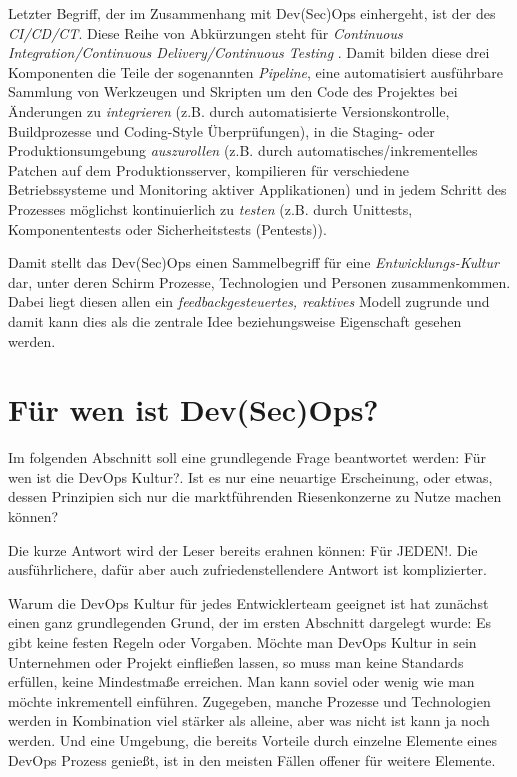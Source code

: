 Letzter Begriff, der im Zusammenhang mit Dev(Sec)Ops einhergeht, ist der des \emph{CI/CD/CT}. Diese Reihe von Abkürzungen steht für \emph{Continuous Integration/Continuous Delivery/Continuous Testing} \cite{kinsbrunerHowMakeCI2018}. Damit bilden diese drei Komponenten die Teile der sogenannten \emph{Pipeline}, eine automatisiert ausführbare Sammlung von Werkzeugen und Skripten um den Code des Projektes bei Änderungen zu \emph{integrieren} (z.B. durch automatisierte Versionskontrolle, Buildprozesse und Coding-Style Überprüfungen), in die Staging- oder Produktionsumgebung \emph{auszurollen} (z.B. durch automatisches/inkrementelles Patchen auf dem Produktionsserver, kompilieren für verschiedene Betriebssysteme und Monitoring aktiver Applikationen) und in jedem Schritt des Prozesses möglichst kontinuierlich zu \emph{testen} (z.B. durch Unittests, Komponententests oder Sicherheitstests (Pentests)). 

Damit stellt das Dev(Sec)Ops einen Sammelbegriff für eine \emph{Entwicklungs-Kultur} \cite{kolblSoftwareentwicklungMitDev2021} dar, unter deren Schirm Prozesse, Technologien und Personen zusammenkommen. Dabei liegt diesen allen ein \emph{feedbackgesteuertes, reaktives} Modell zugrunde und damit kann dies als die zentrale Idee beziehungsweise Eigenschaft gesehen werden.

\section{Für wen ist Dev(Sec)Ops?}

Im folgenden Abschnitt soll eine grundlegende Frage beantwortet werden: \glqq Für wen ist die DevOps Kultur?\grqq{}. 
Ist es nur eine neuartige Erscheinung, oder etwas, dessen Prinzipien sich nur die marktführenden Riesenkonzerne zu Nutze machen können?

Die kurze Antwort wird der Leser bereits erahnen können: \glqq Für JEDEN!\grqq{}. Die ausführlichere, dafür aber auch zufriedenstellendere Antwort ist komplizierter. 

Warum die DevOps Kultur für jedes Entwicklerteam geeignet ist hat zunächst einen ganz grundlegenden Grund, der im ersten Abschnitt dargelegt wurde: Es gibt keine festen Regeln oder Vorgaben. Möchte man DevOps Kultur in sein Unternehmen oder Projekt einfließen lassen, so muss man keine Standards erfüllen, keine Mindestmaße erreichen. 
Man kann soviel oder wenig wie man möchte inkrementell einführen.
Zugegeben, manche Prozesse und Technologien werden in Kombination viel stärker als alleine, aber was nicht ist kann ja noch werden.
Und eine Umgebung, die bereits Vorteile durch einzelne Elemente eines DevOps Prozess genießt, ist in den meisten Fällen offener für weitere Elemente. 

